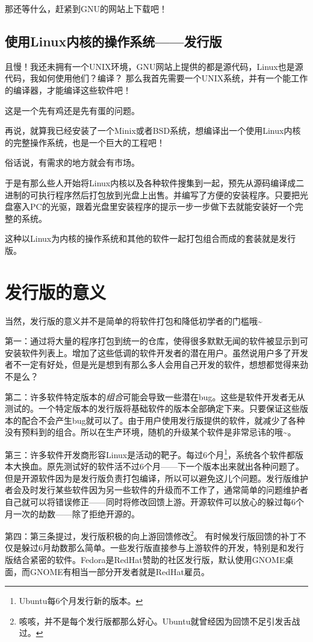 \documentclass[amstex,twoside]{ctexbook}
\begin{document}
那还等什么，赶紧到GNU的网站上下载吧！

\subsection{使用Linux内核的操作系统——发行版}
且慢！我还未拥有一个UNIX环境，GNU网站上提供的都是源代码，Linux也是源代码，我如何使用他们？编译？
那么我首先需要一个UNIX系统，并有一个能工作的编译器，才能编译这些软件吧！

这是一个先有鸡还是先有蛋的问题。

再说，就算我已经安装了一个Minix或者BSD系统，想编译出一个使用Linux内核的完整操作系统，也是一个巨大的工程吧！

俗话说，有需求的地方就会有市场。

于是有那么些人开始将Linux内核以及各种软件搜集到一起，预先从源码编译成二进制的可执行程序然后打包放到光盘上出售。并编写了方便的安装程序。只要把光盘塞入PC的光驱，跟着光盘里安装程序的提示一步一步做下去就能安装好一个完整的系统。

这种以Linux为内核的操作系统和其他的软件一起打包组合而成的套装就是发行版。


\section{发行版的意义}
当然，发行版的意义并不是简单的将软件打包和降低初学者的门槛哦\textasciitilde

第一：通过将大量的程序打包到统一的仓库，使得很多默默无闻的软件被显示到可安装软件列表上。增加了这些低调的软件开发者的潜在用户。虽然说用户多了开发者不一定有好处，但是光是想到有那么多人会用自己开发的软件，想想都觉得来劲不是么？

第二：许多软件特定版本的\emph{组合}可能会导致一些潜在bug。这些是软件开发者无从测试的。一个特定版本的发行版将基础软件的版本全部确定下来。只要保证这些版本的配合不会产生bug就可以了。由于用户使用发行版提供的软件，就减少了各种没有预料到的组合。所以在生产环境，随机的升级某个软件是非常忌讳的哦\textasciitilde。

第三：许多软件开发商形容Linux是活动的靶子。每过6个月\footnote{Ubuntu每6个月发行新的版本。}，系统各个软件都版本大换血。原先测试好的软件活不过6个月——下一个版本出来就出各种问题了。但是开源软件因为是发行版负责打包编译，所以可以避免这儿个问题。发行版维护者会及时发行某些软件因为另一些软件的升级而不工作了，通常简单的问题维护者自己就可以将错误修正——同时将修改回馈上游。开源软件可以放心的躲过每6个月一次的劫数——除了拒绝开源的。

第四：第三条提过，发行版积极的向上游回馈修改\footnote{咳咳，并不是每个发行版都那么好心。Ubuntu就曾经因为回馈不足引发舌战过。}。
有时候发行版回馈的补丁不仅是躲过6月劫数那么简单。一些发行版直接参与上游软件的开发，特别是和发行版结合紧密的软件。Fedora是RedHat赞助的社区发行版，默认使用GNOME桌面，而GNOME有相当一部分开发者就是RedHat雇员。
\end{document}
